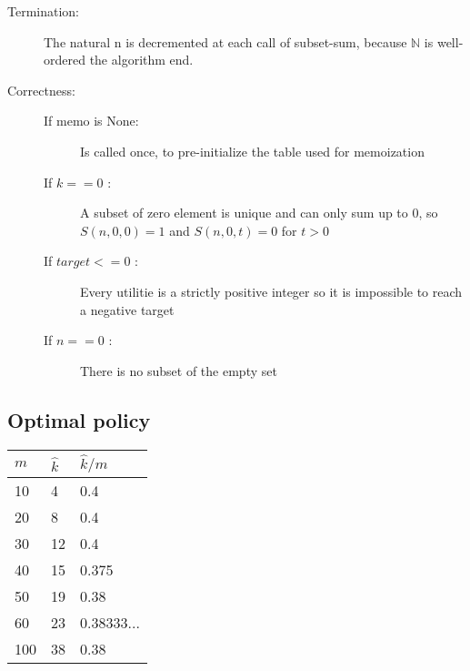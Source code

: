 \documentclass[a4paper, english, 10pt]{article}
\begin{document}
\begin{description}
	\item[Termination:] The natural n is decremented at each call of subset-sum, because $\mathbb{N}$ is well-ordered the algorithm end.
	\item[Correctness:] 
	
		\begin{description}
			
			\item[If memo is None:] Is called once, to pre-initialize the table used for memoization
			\item[If $k==0$ :] A subset of zero element is unique and can only sum up to 0, so $S(n,0,0) = 1$ and $S(n,0,t) = 0$ for $t > 0$ 
			\item[If $target <= 0$ :] Every utilitie is a strictly positive integer so it is impossible to reach a negative target
			\item[If $n==0$ :] There is no subset of the empty set
			 
		\end{description}
\end{description} 


\subsection{Optimal policy}

\begin{tabular}{lll}
  \toprule
  $m$ & $\hat{k}$ & $\hat{k} / m$\\
  \midrule
  10 & 4 & 0.4\\
  20 & 8 & 0.4\\
  30 & 12 & 0.4\\
  40 & 15 & 0.375\\
  50 & 19 & 0.38\\
  60 & 23 & 0.38333...\\
  100 & 38 & 0.38\\
  \bottomrule
\end{tabular}



% 
% 
\end{document}
